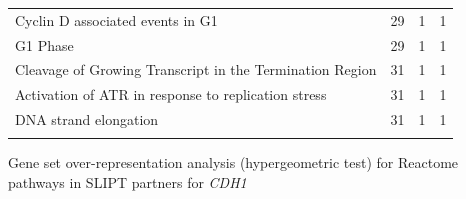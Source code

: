 \begin{table}[!ht]
{\begin{threeparttable}
\begin{tabular}{lccc}
  \rowcolor{black!5}
  Cyclin D associated events in G1 &  29 &   1 &   1 \\ 
  \rowcolor{black!10}
  G1 Phase &  29 &   1 &   1 \\ 
  \rowcolor{black!5}
  Cleavage of Growing Transcript in the Termination Region &  31 &   1 &   1 \\ 
  \rowcolor{black!10}
  Activation of ATR in response to replication stress &  31 &   1 &   1 \\ 
  \rowcolor{black!5}
  DNA strand elongation &  31 &   1 &   1 \\ 
  \rowcolor{black!10}
  \hline
\end{tabular}
\begin{tablenotes}
\raggedright \small
Gene set over-representation analysis (hypergeometric test) for Reactome pathways in SLIPT partners for \textit{CDH1}
\end{tablenotes}
\end{threeparttable}
}
\end{table}


